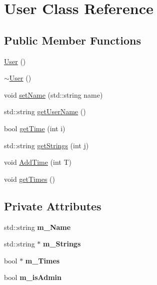 \hypertarget{class_user}{}\section{User Class Reference}
\label{class_user}
\subsection*{Public Member Functions}
\begin{DoxyCompactItemize}
\item 
\mbox{\hyperlink{class_user_a4a0137053e591fbb79d9057dd7d2283d}{User}} ()
\item 
\mbox{\hyperlink{class_user_ac00b72ad64eb4149f7b21b9f5468c2b2}{$\sim$\+User}} ()
\item 
void \mbox{\hyperlink{class_user_a93c208c3a71df99ca19a1782f6d32c34}{set\+Name}} (std\+::string name)
\item 
std\+::string \mbox{\hyperlink{class_user_a3fcf5814ba0a2415862c892746585a46}{get\+User\+Name}} ()
\item 
bool \mbox{\hyperlink{class_user_ab4ba945b0431a19fef9710b16aac4bb5}{get\+Time}} (int i)
\item 
std\+::string \mbox{\hyperlink{class_user_a3b0b9cf712efbb632f920a4cc5f18925}{get\+Strings}} (int j)
\item 
void \mbox{\hyperlink{class_user_a3a637aa0a7a7b37885f2cd7dc77ecd99}{Add\+Time}} (int T)
\item 
void \mbox{\hyperlink{class_user_a70486059b5ee29b656c8331583cdd5b5}{get\+Times}} ()
\end{DoxyCompactItemize}
\subsection*{Private Attributes}
\begin{DoxyCompactItemize}
\item 
\mbox{\label{class_user_acc74e1ba1db43cacac9c488594067060}} 
std\+::string {\bfseries m\+\_\+\+Name}
\item 
\mbox{\label{class_user_ab4a12ecb24141692e886d0d869a2ecea}} 
std\+::string $\ast$ {\bfseries m\+\_\+\+Strings}
\item 
\mbox{\label{class_user_adc7849fb91c414d2ccf836e8284fd058}} 
bool $\ast$ {\bfseries m\+\_\+\+Times}
\item 
\mbox{\label{class_user_a2d7c25a76f9479275b46c45a3e15f300}} 
bool {\bfseries m\+\_\+is\+Admin}
\end{DoxyCompactItemize}


